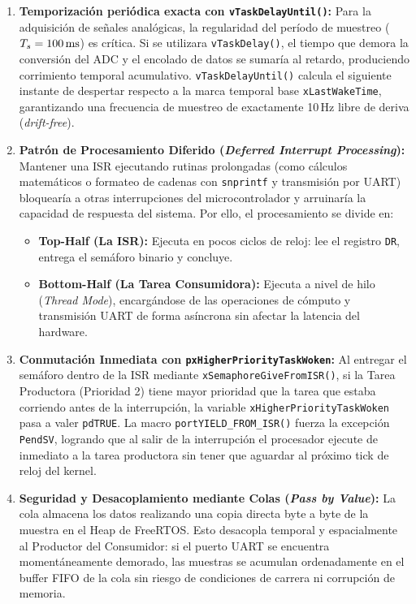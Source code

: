 \documentclass{plantilla}
\begin{document}
\begin{enumerate}
    \item \textbf{Temporización periódica exacta con \texttt{vTaskDelayUntil()}:} Para la adquisición de señales analógicas, la regularidad del período de muestreo ($T_s = 100\text{\,ms}$) es crítica. Si se utilizara \texttt{vTaskDelay()}, el tiempo que demora la conversión del ADC y el encolado de datos se sumaría al retardo, produciendo corrimiento temporal acumulativo. \texttt{vTaskDelayUntil()} calcula el siguiente instante de despertar respecto a la marca temporal base \texttt{xLastWakeTime}, garantizando una frecuencia de muestreo de exactamente 10\,Hz libre de deriva (\textit{drift-free}).
    \item \textbf{Patrón de Procesamiento Diferido (\textit{Deferred Interrupt Processing}):} Mantener una ISR ejecutando rutinas prolongadas (como cálculos matemáticos o formateo de cadenas con \texttt{snprintf} y transmisión por UART) bloquearía a otras interrupciones del microcontrolador y arruinaría la capacidad de respuesta del sistema. Por ello, el procesamiento se divide en:
    \begin{itemize}
        \item \textbf{Top-Half (La ISR):} Ejecuta en pocos ciclos de reloj: lee el registro \texttt{DR}, entrega el semáforo binario y concluye.
        \item \textbf{Bottom-Half (La Tarea Consumidora):} Ejecuta a nivel de hilo (\textit{Thread Mode}), encargándose de las operaciones de cómputo y transmisión UART de forma asíncrona sin afectar la latencia del hardware.
    \end{itemize}
    \item \textbf{Conmutación Inmediata con \texttt{pxHigherPriorityTaskWoken}:} Al entregar el semáforo dentro de la ISR mediante \texttt{xSemaphoreGiveFromISR()}, si la Tarea Productora (Prioridad 2) tiene mayor prioridad que la tarea que estaba corriendo antes de la interrupción, la variable \texttt{xHigherPriorityTaskWoken} pasa a valer \texttt{pdTRUE}. La macro \texttt{portYIELD\_FROM\_ISR()} fuerza la excepción \texttt{PendSV}, logrando que al salir de la interrupción el procesador ejecute de inmediato a la tarea productora sin tener que aguardar al próximo tick de reloj del kernel.
    \item \textbf{Seguridad y Desacoplamiento mediante Colas (\textit{Pass by Value}):} La cola almacena los datos realizando una copia directa byte a byte de la muestra en el Heap de FreeRTOS. Esto desacopla temporal y espacialmente al Productor del Consumidor: si el puerto UART se encuentra momentáneamente demorado, las muestras se acumulan ordenadamente en el buffer FIFO de la cola sin riesgo de condiciones de carrera ni corrupción de memoria.
\end{enumerate}
\end{document}
